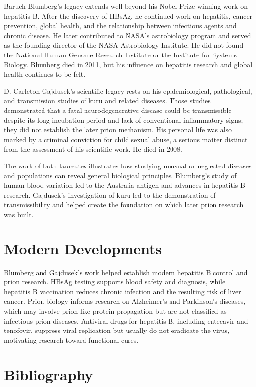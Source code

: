 Baruch Blumberg's legacy extends well beyond his Nobel Prize-winning work on hepatitis B. After the discovery of HBsAg, he continued work on hepatitis, cancer prevention, global health, and the relationship between infectious agents and chronic disease. He later contributed to NASA's astrobiology program and served as the founding director of the NASA Astrobiology Institute. He did not found the National Human Genome Research Institute or the Institute for Systems Biology. Blumberg died in 2011, but his influence on hepatitis research and global health continues to be felt.

D. Carleton Gajdusek's scientific legacy rests on his epidemiological, pathological, and transmission studies of kuru and related diseases. Those studies demonstrated that a fatal neurodegenerative disease could be transmissible despite its long incubation period and lack of conventional inflammatory signs; they did not establish the later prion mechanism. His personal life was also marked by a criminal conviction for child sexual abuse, a serious matter distinct from the assessment of his scientific work. He died in 2008.

The work of both laureates illustrates how studying unusual or neglected diseases and populations can reveal general biological principles. Blumberg's study of human blood variation led to the Australia antigen and advances in hepatitis B research. Gajdusek's investigation of kuru led to the demonstration of transmissibility and helped create the foundation on which later prion research was built.


\section{Modern Developments}

Blumberg and Gajdusek's work helped establish modern hepatitis B control and prion research. HBsAg testing supports blood safety and diagnosis, while hepatitis B vaccination reduces chronic infection and the resulting risk of liver cancer. Prion biology informs research on Alzheimer's and Parkinson's diseases, which may involve prion-like protein propagation but are not classified as infectious prion diseases. Antiviral drugs for hepatitis B, including entecavir and tenofovir, suppress viral replication but usually do not eradicate the virus, motivating research toward functional cures.


\section{Bibliography}

